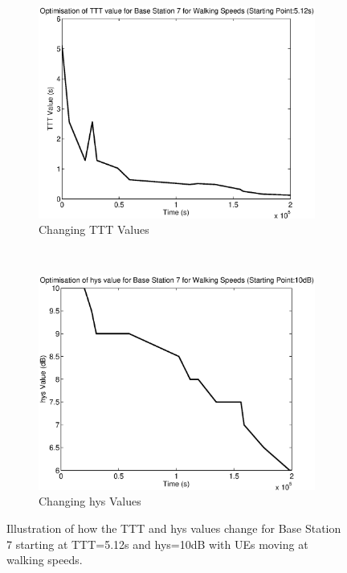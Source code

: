 \begin{figure}[H]
        \centering
        \begin{subfigure}[b]{0.49\textwidth}
                \includegraphics[width=\textwidth]{figures/graphs/walkhigh/TTT7.eps}
                \caption{Changing TTT Values}
        \end{subfigure}%
        ~ %
        \begin{subfigure}[b]{0.49\textwidth}
                \includegraphics[width=\textwidth]{figures/graphs/walkhigh/hys7.eps}
                \caption{Changing hys Values}
        \end{subfigure}
        \caption{Illustration of how the TTT and hys values change for Base Station 7 starting at TTT=5.12s and hys=10dB with UEs moving at walking speeds.}
\end{figure}
